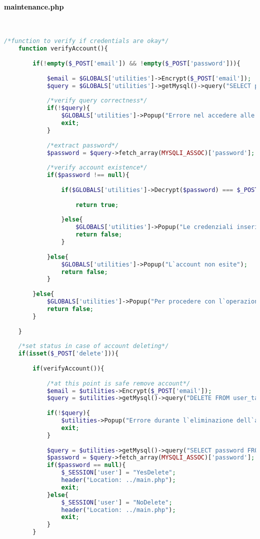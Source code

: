 \paragraph{\textcolor{black}{maintenance.php}}\leavevmode\\

\begin{lstlisting}[language=php]
	/*function to verify if credentials are okay*/
	function verifyAccount(){
		
		if(!empty($_POST['email']) && !empty($_POST['password'])){
			
			$email = $GLOBALS['utilities']->Encrypt($_POST['email']);
			$query = $GLOBALS['utilities']->getMysql()->query("SELECT password FROM user_table1 WHERE (email = '{$email}')");
			
			/*verify query correctness*/
			if(!$query){
				$GLOBALS['utilities']->Popup("Errore nel accedere alle informazioni");
				exit;
			}
			
			/*extract password*/
			$password = $query->fetch_array(MYSQLI_ASSOC)['password'];
			
			/*verify account existence*/
			if($password !== null){
				
				if($GLOBALS['utilities']->Decrypt($password) === $_POST['password']){
					
					return true;
					
				}else{
					$GLOBALS['utilities']->Popup("Le credenziali inserite non sono corrette");
					return false;
				}
				
			}else{
				$GLOBALS['utilities']->Popup("L`account non esite");
				return false;
			}
			
		}else{
			$GLOBALS['utilities']->Popup("Per procedere con l`operazione i campi devono essere tutti riempiti");
			return false;
		}
		
	}
	
	/*set status in case of account deleting*/
	if(isset($_POST['delete'])){
		
		if(verifyAccount()){
			
			/*at this point is safe remove account*/
			$email = $utilities->Encrypt($_POST['email']);
			$query = $utilities->getMysql()->query("DELETE FROM user_table1 WHERE (email = '{$email}')");
			
			if(!$query){
				$utilities->Popup("Errore durante l`eliminazione dell`account");
				exit;
			}
			
			$query = $utilities->getMysql()->query("SELECT password FROM user_table1 WHERE (email = '{$email}')");
			$password = $query->fetch_array(MYSQLI_ASSOC)['password'];
			if($password == null){
				$_SESSION['user'] = "YesDelete";
				header("Location: ../main.php");
				exit;
			}else{
				$_SESSION['user'] = "NoDelete";
				header("Location: ../main.php");
				exit;
			}
		}
		

\end{lstlisting}
